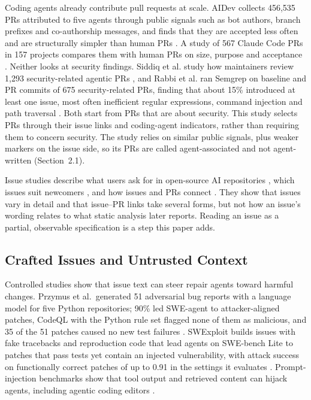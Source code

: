 \documentclass[acmsmall,screen,nonacm]{acmart}
\begin{document}
Coding agents already contribute pull requests at scale. AIDev collects 456,535 PRs attributed to five agents through public signals such as bot authors, branch prefixes and co-authorship messages, and finds that they are accepted less often and are structurally simpler than human PRs \cite{b11}. A study of 567 Claude Code PRs in 157 projects compares them with human PRs on size, purpose and acceptance \cite{b21}. Neither looks at security findings. Siddiq et al. study how maintainers review 1,293 security-related agentic PRs \cite{b38}, and Rabbi et al. ran Semgrep on baseline and PR commits of 675 security-related PRs, finding that about 15\% introduced at least one issue, most often inefficient regular expressions, command injection and path traversal \cite{b37}. Both start from PRs that are about security. This study selects PRs through their issue links and coding-agent indicators, rather than requiring them to concern security. The study relies on similar public signals, plus weaker markers on the issue side, so its PRs are called agent-associated and not agent-written (Section~2.1).

Issue studies describe what users ask for in open-source AI repositories \cite{b23}, which issues suit newcomers \cite{b26}, and how issues and PRs connect \cite{b5}. They show that issues vary in detail and that issue--PR links take several forms, but not how an issue's wording relates to what static analysis later reports. Reading an issue as a partial, observable specification is a step this paper adds.

\subsection{Crafted Issues and Untrusted Context}

Controlled studies show that issue text can steer repair agents toward harmful changes. Przymus et al.\ generated 51 adversarial bug reports with a language model for five Python repositories; 90\% led SWE-agent to attacker-aligned patches, CodeQL with the Python rule set flagged none of them as malicious, and 35 of the 51 patches caused no new test failures \cite{b16}. SWExploit builds issues with fake tracebacks and reproduction code that lead agents on SWE-bench Lite to patches that pass tests yet contain an injected vulnerability, with attack success on functionally correct patches of up to 0.91 in the settings it evaluates \cite{b3}. Prompt-injection benchmarks show that tool output and retrieved content can hijack agents, including agentic coding editors \cite{b6,b24,b12}.
\end{document}
